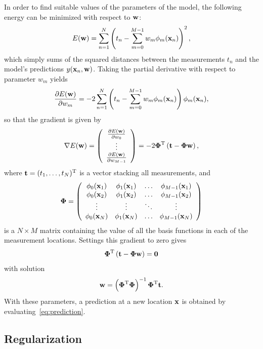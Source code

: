 \documentclass[10pt,twoside]{book}
\begin{document}
In order to find suitable values of the parameters of the model, the following energy can be minimized with respect to $\mathbf{w}$:
$$
E( \mathbf{w} ) = \sum_{n=1}^N 
               \left( t_n - \sum_{m=0}^{M-1} w_m \phi_m(\mathbf{x}_n) \right)^2
,               
$$
which simply sums of the squared distances between the measurements $t_n$ and the model's predictions $y(\mathbf{x}_n, \mathbf{w})$.
Taking the partial derivative with respect to parameter $w_m$ yields
$$
\frac{\partial E( \mathbf{w} ) }{ \partial w_m}
=
-2
\sum_{n=1}^N 
\left( t_n - \sum_{m=0}^{M-1} w_m \phi_m(\mathbf{x}_n) \right)
\phi_m(\mathbf{x}_n)
,
$$
so that the gradient is given by
$$
\nabla E( \mathbf{w} )
=
\left(
\begin{array}{c}
\frac{\partial E( \mathbf{w} ) }{ \partial w_0} \\
\vdots \\
\frac{\partial E( \mathbf{w} ) }{ \partial w_{M-1}}
\end{array}
\right)
=
-2
{\mbox{\boldmath {${\Phi}$}}}^\mathrm{T}
\left( \mathbf{t} - {\mbox{\boldmath {${\Phi}$}}} \mathbf{w} \right)
,
$$
where $\mathbf{t} = (t_1, \ldots, t_N)^\mathrm{T}$
is a vector stacking all measurements,
and 
\begin{equation}
{\mbox{\boldmath {${\Phi}$}}} 
=
\left(
\begin{array}{cccc}
\phi_0( \mathbf{x}_1 ) & \phi_1( \mathbf{x}_1 ) & \hdots & \phi_{M-1}( \mathbf{x}_1 ) \\  
\phi_0( \mathbf{x}_2 ) & \phi_1( \mathbf{x}_2 ) & \hdots & \phi_{M-1}( \mathbf{x}_2 ) \\  
\vdots              & \vdots              & \ddots & \vdots  \\  
\phi_0( \mathbf{x}_N ) & \phi_1( \mathbf{x}_N ) & \hdots & \phi_{M-1}( \mathbf{x}_N ) \\  
\end{array}
\right)
\label{eq:Phi}
\end{equation}
is a $N \times M$ matrix containing the value of all the basis functions in each of the measurement locations.
Settings this gradient to zero gives 
$$
{\mbox{\boldmath {${\Phi}$}}}^\mathrm{T}
\left( \mathbf{t} - {\mbox{\boldmath {${\Phi}$}}} \mathbf{w} \right) 
= \mathbf{0}
$$
with solution 
\begin{equation}
\mathbf{w} =
\left( {\mbox{\boldmath {${\Phi}$}}}^\mathrm{T} {\mbox{\boldmath {${\Phi}$}}} \right)^{-1}
{\mbox{\boldmath {${\Phi}$}}}^\mathrm{T} \mathbf{t}
\label{eq:coefficients}
.
\end{equation}
%
With these parameters, a prediction at a new location $\mathbf{x}$ is obtained by evaluating~\eqref{eq:prediction}.


\subsection{Regularization}
\end{document}
